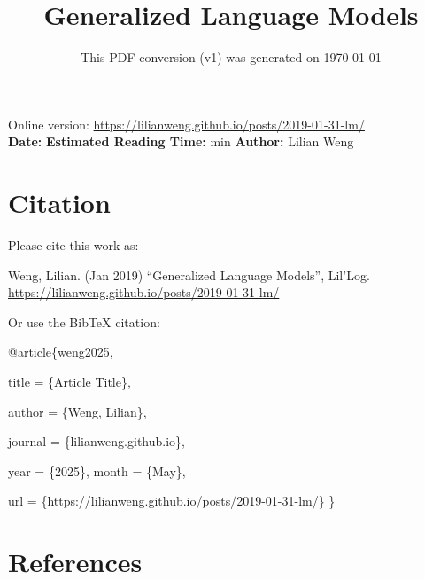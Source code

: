 \documentclass[12pt]{article}
\title{Generalized Language Models}
\date{This PDF conversion (v1) was generated on \today\footnotemark}
\begin{document}
\maketitle
\begin{center}
    Online version: \url{https://lilianweng.github.io/posts/2019-01-31-lm/} \\
    \textbf{Date:} \quad
    \textbf{Estimated Reading Time:}  min \quad
    \textbf{Author:} Lilian Weng
\end{center}




\newpage
\tableofcontents
\newpage
\vspace{1em}
\n\n\n\section{Citation}
Please cite this work as:

\begin{tcolorbox}[colback=black!5!white, colframe=black!80!white, boxrule=0.5pt, arc=2mm, left=1mm, right=1mm, top=1mm, bottom=1mm]
  Weng, Lilian. (Jan 2019) ``Generalized Language Models'', Lil'Log. \url{https://lilianweng.github.io/posts/2019-01-31-lm/}
  \end{tcolorbox}

Or use the BibTeX citation:

\begin{tcolorbox}[
    colback=black!5!white,
    colframe=black!80!white,
    boxrule=0.5pt,
    arc=2mm,
    left=1mm,
    right=1mm,
    top=1mm,
    bottom=1mm,
    listing only,
    listing options={
      basicstyle=\ttfamily\footnotesize,
      breaklines=true,
      literate={\{}{{\char`\{}}1 {\}}{{\char`\}}}1
    }
  ]
  @article\{weng2025,

    title   = \{Article Title\},

    author  = \{Weng, Lilian\},

    journal = \{lilianweng.github.io\},

    year    = \{2025\},
    month   = \{May\},

    url     = \{https://lilianweng.github.io/posts/2019-01-31-lm/\}\n
  \}
  \end{tcolorbox}

\newpage
\section{References}

\n
\end{document}

